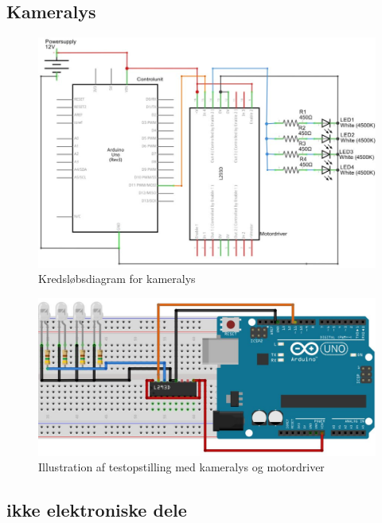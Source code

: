  \subsection{Kameralys}
 
 \begin{figure}[H]
	\centering
	\includegraphics[width=1\textwidth]{billeder/Hardware/diagrammer/LEDdiagram.JPG}
	\caption{Kredsløbsdiagram for kameralys}
	\label{fig:LEDdiagram}
\end{figure} 

\begin{figure}[H]
	\centering
	\includegraphics[width=1\textwidth]{billeder/Hardware/diagrammer/LEDbreadboard.JPG}
	\caption{Illustration af testopstilling med kameralys og motordriver}
	\label{fig:LEDbreadboard}
\end{figure}
 
 
 
 
\subsection{ikke elektroniske dele}
 

